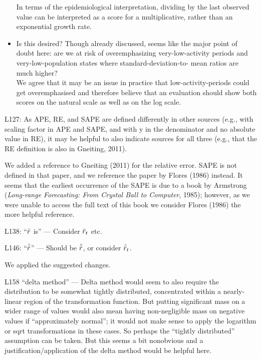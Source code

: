 \documentclass{article}
\newcommand{\black}{\color{black}}
\newcommand{\blue}{\color{blue}}
\begin{document}
\begin{itemize}
    In terms of the epidemiological  interpretation, dividing by the last observed value can be interpreted as a score for a multiplicative, rather than an exponential growth rate. %
    \item \blue Is this desired? Though already discussed, seems like the major point of doubt here: are we at risk of overemphasizing very-low-activity periods and very-low-population states where standard-deviation-to- mean ratios are much higher?\\
    \black We agree that it may be an issue in practice that low-activity-periods could get overemphasised and therefore believe that an evaluation should show both scores on the natural scale as well as on the log scale. 
\end{itemize}







\blue

L127: As APE, RE, and SAPE are defined differently in other sources (e.g., with scaling factor in APE and SAPE, and with y in the denominator and no absolute value in RE), it may be helpful to also indicate sources for all three (e.g., that the RE definition is also in Gneiting, 2011).

\black
We added a reference to Gneiting (2011) for the relative error. SAPE is not defined in that paper, and we reference the paper by Flores (1986) instead. It seems that the earliest occurrence of the SAPE is due to a book by Armstrong (\textit{Long-range Forecasting: From Crystal Ball to Computer}, 1985); however, as we were unable to access the full text of this book we consider Flores (1986) the more helpful reference.

\blue

L138: “$\Bar{r}$ is” — Consider $\Bar{r}_t$ etc.

L146: “$\Bar{\hat{r}}$” — Should be $\hat{\Bar{r}}$, or consider $\hat{\Bar{r}}_t$.

\black
We applied the suggested changes.

\blue
L158 “delta method” — Delta method would seem to also require the distribution to be somewhat tightly distributed, concentrated within a nearly-linear region of the transformation function. But putting significant mass on a wider range of values would also mean having non-negligible mass on negative values if “approximately normal”; it would not make sense to apply the logarithm or sqrt transformations in these cases. So perhaps the “tightly distributed” assumption can be taken. But this seems a bit nonobvious and a justification/application of the delta method would be helpful here.
\end{document}
